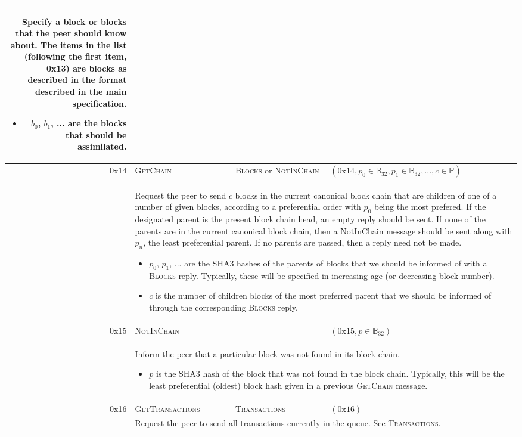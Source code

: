 \documentclass[9pt,oneside]{amsart}
\begin{document}
\begin{tabular*}{\columnwidth}[h]{rlll}
{Specify a block or blocks that the peer should know about. The items in the list (following the first item, 0x13) are blocks as described in the format described in the main specification.
\begin{itemize}
\item $b_0$, $b_1$, ... are the blocks that should be assimilated.
\end{itemize}
}\\
\midrule
0x14 & \textsc{GetChain} & \textsc{Blocks} or \textsc{NotInChain} & $(\text{0x}14, p_0 \in \mathbb{B}_{32}, p_1 \in \mathbb{B}_{32}, ..., c \in \mathbb{P})$ \\
& \multicolumn{3}{p{0.8\columnwidth}}{
Request the peer to send $c$ blocks in the current canonical block chain that are children of one of a number of given blocks, according to a preferential order with $p_0$ being the most prefered. If the designated parent is the present block chain head, an empty reply should be sent. If none of the parents are in the current canonical block chain, then a NotInChain message should be sent along with $p_n$, the least preferential parent. If no parents are passed, then a reply need not be made.
\begin{itemize}
\item $p_0$, $p_1$, ... are the SHA3 hashes of the parents of blocks that we should be informed of with a \textsc{Blocks} reply. Typically, these will be specified in increasing age (or decreasing block number).
\item $c$ is the number of children blocks of the most preferred parent that we should be informed of through the corresponding \textsc{Blocks} reply.
\end{itemize}
}\\
\midrule
0x15 & \textsc{NotInChain} && $(\text{0x}15, p \in \mathbb{B}_{32})$ \\
& \multicolumn{3}{p{0.8\columnwidth}}{Inform the peer that a particular block was not found in its block chain.
\begin{itemize}
\item $p$ is the SHA3 hash of the block that was not found in the block chain. Typically, this will be the least preferential (oldest) block hash given in a previous \textsc{GetChain} message.
\end{itemize}
}\\
\midrule
0x16 & \textsc{GetTransactions} & \textsc{Transactions} & $(\text{0x}16)$ \\
& \multicolumn{3}{p{0.8\columnwidth}}{Request the peer to send all transactions currently in the queue. See \textsc{Transactions}.}\\
\bottomrule
\end{tabular*}
\end{document}
